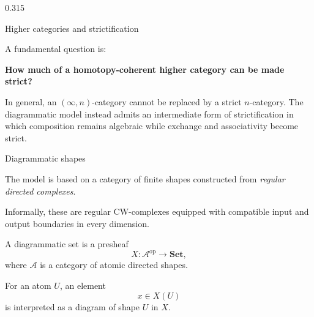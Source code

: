\documentclass[final]{beamer}
\newcommand{\op}{\mathrm{op}}
\begin{document}
\begin{frame}[fragile, t]
\begin{columns}[t,totalwidth=\textwidth]
\begin{column}{0.315\textwidth}
\begin{block}{Higher categories and strictification}
\medskip

A fundamental question is:

\begin{center}
\Large
\textbf{How much of a homotopy-coherent higher category can be made strict?}
\end{center}

\medskip

In general, an $(\infty,n)$-category cannot be replaced by a strict
$n$-category. The diagrammatic model instead admits an intermediate
form of strictification in which composition remains algebraic while
exchange and associativity become strict.

\end{block}

\begin{block}{Diagrammatic shapes}

The model is based on a category of finite shapes constructed from
\emph{regular directed complexes}.

\medskip

Informally, these are regular CW-complexes equipped with compatible
input and output boundaries in every dimension.

\medskip

A diagrammatic set is a presheaf
\[
  X \colon \mathcal{A}^{\op}\longrightarrow \mathbf{Set},
\]
where $\mathcal{A}$ is a category of atomic directed shapes.

\medskip

For an atom $U$, an element
\[
  x\in X(U)
\]
is interpreted as a diagram of shape $U$ in $X$.

\medskip

\begin{center}
\end{center}


\end{block}
\end{column}
\end{columns}
\end{frame}
\end{document}
